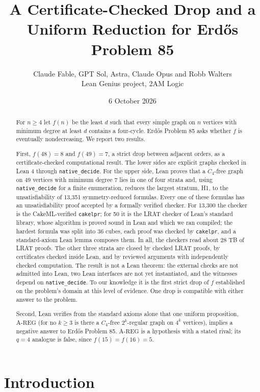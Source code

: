 \documentclass{anvil-paper}
\title{A Certificate-Checked Drop and a Uniform Reduction for Erdős Problem 85}
\author{Claude Fable, GPT Sol, Astra, Claude Opus and Robb Walters \\ Lean Genius project, 2AM Logic}
\date{6 October 2026}
\newcommand{\AREG}{\mathrm{A\text{-}REG}}
\newcommand{\cakelpr}{\texttt{cake\textunderscore lpr}}
\theoremstyle{definition}
\begin{document}
\maketitle

\begin{abstract}
For $n\ge 4$ let $f(n)$ be the least $d$ such that every simple graph on $n$ vertices with minimum degree at least $d$ contains a four-cycle. Erdős Problem 85 asks whether $f$ is eventually nondecreasing. We report two results.

First, $f(48)=8$ and $f(49)=7$, a strict drop between adjacent orders, as a certificate-checked computational result. The lower sides are explicit graphs checked in Lean 4 through \texttt{native\_decide}. For the upper side, Lean proves that a $C_4$-free graph on 49 vertices with minimum degree 7 lies in one of four strata and, using \texttt{native\_decide} for a finite enumeration, reduces the largest stratum, H1, to the unsatisfiability of 13,351 symmetry-reduced formulas. Every one of these formulas has an unsatisfiability proof accepted by a formally verified checker. For 13,300 the checker is the CakeML-verified \cakelpr{}; for 50 it is the LRAT checker of Lean's standard library, whose algorithm is proved sound in Lean and which we ran compiled; the hardest formula was split into 36 cubes, each proof was checked by \cakelpr{}, and a standard-axiom Lean lemma composes them. In all, the checkers read about 28 TB of LRAT proofs. The other three strata are closed by checked LRAT proofs, by certificates checked inside Lean, and by reviewed arguments with independently checked computation. The result is not a Lean theorem: the external checks are not admitted into Lean, two Lean interfaces are not yet instantiated, and the witnesses depend on \texttt{native\_decide}. To our knowledge it is the first strict drop of $f$ established on the problem's domain at this level of evidence. One drop is compatible with either answer to the problem.

Second, Lean verifies from the standard axioms alone that one uniform proposition, $\AREG$ (for no $k\ge 3$ is there a $C_4$-free $2^k$-regular graph on $4^k$ vertices), implies a negative answer to Erdős Problem 85. $\AREG$ is a hypothesis with a stated rival; its $q=4$ analogue is false, since $f(15)=f(16)=5$.
\end{abstract}

\section{Introduction}\label{sec:intro}
\end{document}
